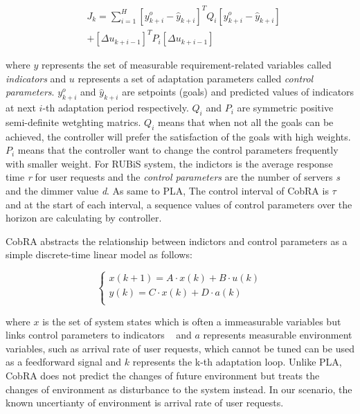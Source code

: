 \documentclass[sigconf]{acmart}
\begin{document}
\begin{equation}
\begin{aligned}
&J_{k}=\sum_{i=1}^H [y_{k+i}^o -\hat{y}_{k+i}]^TQ_{i}[y_{k+i}^o -\hat{y}_{k+i}] \\
&+[\Delta u_{k+i-1}]^T P_{i}[\Delta u_{k+i-1}]
\end{aligned}
\end{equation}

where $y$ represents the set of measurable requirement-related variables called \textit{indicators} and $u$ represents a set of adaptation parameters called \textit{control parameters}. $y_{k+i}^o$ and $\hat{y}_{k+i}$ are setpoints (goals) and predicted values of indicators at next $i$-th adaptation period respectively. $Q_{i}$ and $P_{i}$ are symmetric positive semi-definite wetghting matrics. $Q_i$ means that when not all the goals can be achieved, the controller will prefer the satisfaction of the goals with high weights. $P_i$ means that the controller want to change the control parameters frequently with smaller weight. For RUBiS system, the indictors is the average response time \textit{r} for user requests and the \textit{control parameters} are the number of servers \textit{s} and the dimmer value \textit{d}. As same to PLA, The control interval of CobRA is $\tau$ and at the start of each interval, a sequence values of control parameters over the horizon are calculating by controller.

CobRA abstracts the relationship between indictors and control parameters as a simple discrete-time linear model as follows:

\begin{equation}
\left\{
\begin{array}{rcl}
x(k+1)=A\cdot x(k)+B\cdot u(k)\\
y(k)=C\cdot x(k)+D\cdot a(k)\\
\end{array} \right.
\end{equation}

\noindent where $x$ is the set of system states which is often a immeasurable variables but links control parameters to indicators ~\cite{maggio2017automated} and $a$ represents measurable environment variables, such as arrival rate of user requests, which cannot be tuned can be used as a feedforward signal and $k$ represents the k-th adaptation loop. Unlike PLA, CobRA does not predict the changes of future environment but treats the changes of environment as disturbance to the system instead. In our scenario, the known uncertianty of environment is arrival rate of user requests.
\end{document}
